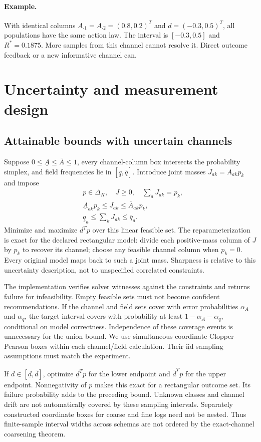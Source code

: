 \documentclass[10pt,twocolumn]{article}
\theoremstyle{definition}\newtheorem{definition}[theorem]{Definition}
\newcommand{\simplex}{\Delta_K}
\newcommand{\1}{\mathbf 1}
\begin{document}
\paragraph{Example.} With identical columns $A_{\cdot1}=A_{\cdot2}=(0.8,0.2)^T$ and $d=(-0.3,0.5)^T$, all populations have the same action law. The interval is $[-0.3,0.5]$ and $R^*=0.1875$. More samples from this channel cannot resolve it. Direct outcome feedback or a new informative channel can.

\section{Uncertainty and measurement design}
\subsection{Attainable bounds with uncertain channels}
Suppose $0\leq\underline A\leq\overline A\leq1$, every channel-column box intersects the probability simplex, and field frequencies lie in $[\underline q,\overline q]$. Introduce joint masses $J_{ak}=A_{ak}p_k$ and impose
\begin{align}
 &p\in\simplex,\quad J\geq0,\quad \sum_aJ_{ak}=p_k,\\
 &\underline A_{ak}p_k\leq J_{ak}\leq\overline A_{ak}p_k,\\
 &\underline q_a\leq\sum_kJ_{ak}\leq\overline q_a.
\end{align}
Minimize and maximize $d^Tp$ over this linear feasible set. The reparameterization is exact for the declared rectangular model: divide each positive-mass column of $J$ by $p_k$ to recover its channel; choose any feasible channel column when $p_k=0$. Every original model maps back to such a joint mass. Sharpness is relative to this uncertainty description, not to unspecified correlated constraints.

The implementation verifies solver witnesses against the constraints and returns failure for infeasibility. Empty feasible sets must not become confident recommendations. If the channel and field sets cover with error probabilities $\alpha_A$ and $\alpha_q$, the target interval covers with probability at least $1-\alpha_A-\alpha_q$, conditional on model correctness. Independence of these coverage events is unnecessary for the union bound. We use simultaneous coordinate Clopper--Pearson boxes within each channel/field calculation. Their iid sampling assumptions must match the experiment.

If $d\in[\underline d,\overline d]$, optimize $\underline d^Tp$ for the lower endpoint and $\overline d^Tp$ for the upper endpoint. Nonnegativity of $p$ makes this exact for a rectangular outcome set. Its failure probability adds to the preceding bound. Unknown classes and channel drift are not automatically covered by these sampling intervals. Separately constructed coordinate boxes for coarse and fine logs need not be nested. Thus finite-sample interval widths across schemas are not ordered by the exact-channel coarsening theorem.
\end{document}
